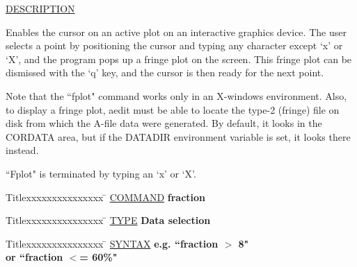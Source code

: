 \underline{DESCRIPTION}
\begin{list}{}{\setlength{\leftmargin}{0.5in}
     \setlength{\rightmargin}{0in}}
\item
Enables the cursor on an active plot on an interactive
graphics device.  The user selects a point by positioning
the cursor and typing any character except `x' or `X', and 
the program pops up a fringe plot on the screen.  This fringe
plot can be dismissed with the `q' key, and the cursor is then
ready for the next point.
\item
Note that the ``fplot" command works only in an X-windows
environment.  Also, to display a fringe plot, aedit must be
able to locate the type-2 (fringe) file on disk from which the
A-file data were generated.  By default, it looks in the
CORDATA area, but if the DATADIR environment variable is set,
it looks there instead.
\item
``Fplot" is terminated by typing an `x' or `X'.
\end{list}
\vspace{.2in}

\begin{tabbing}
Titlexxxxxxxxxxxxxxx \= \kill
\underline{COMMAND} \> {\bf 	fraction} \\
\end{tabbing}

\begin{tabbing}
Titlexxxxxxxxxxxxxxx \= \kill
\underline{TYPE} \> {\bf 		Data selection} \\
\end{tabbing}

\begin{tabbing}
Titlexxxxxxxxxxxxxxx \= \kill
\underline{SYNTAX} \> {\bf 	  e.g.	``fraction $>$ 8"} \\
\> {\bf 	    or	``fraction $<$= 60\%"} \\
\end{tabbing}

